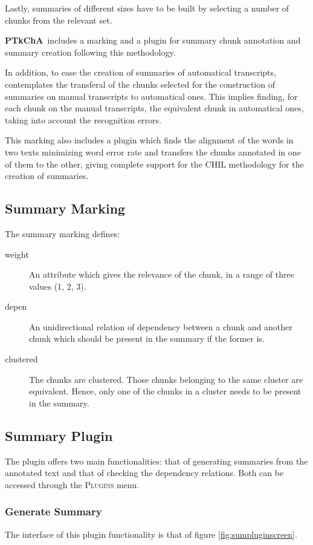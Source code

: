 \documentclass{article}
\newcommand{\ptkcha}{\textbf{PTkChA}}
\begin{document}
Lastly, summaries of different sizes have to be built by selecting a
number of chunks from the relevant set.

\ptkcha\ includes a marking and a plugin for summary chunk annotation
and summary creation following this methodology.

In addition, to ease the creation of summaries of automatical
transcripts, \cite{fuentes05chil} contemplates the transferal of the
chunks selected for the construction of summaries on manual
transcripts to automatical ones. This implies finding, for each chunk
on the manual transcripts, the equivalent chunk in automatical ones,
taking into account the recognition errors.

This marking also includes a plugin which finds the alignment of the
words in two texts minimizing word error rate and transfers the chunks
annotated in one of them to the other, giving complete support for the
CHIL methodology for the creation of summaries.

\subsection{Summary Marking}
The summary marking defines:

\begin{description}
\item [weight] An attribute which gives the relevance of the chunk,
in a range of three values (1, 2, 3).

\item [depen] An unidirectional relation of dependency between a chunk
and another chunk which should be present in the summary if the former
is.

\item [clustered] The chunks are clustered. Those chunks belonging to
the same cluster are equivalent. Hence, only one of the chunks in a
cluster needs to be present in the summary.
\end{description}

\subsection{Summary Plugin}
\label{sec:sumplugin}
The plugin offers two main functionalities: that of generating
summaries from the annotated text and that of checking the dependency
relations. Both can be accessed through the \textsc{Plugins} menu.

\subsubsection{Generate Summary}
The interface of this plugin functionality is that of figure
\ref{fig:sumpluginscreen}.
\end{document}
